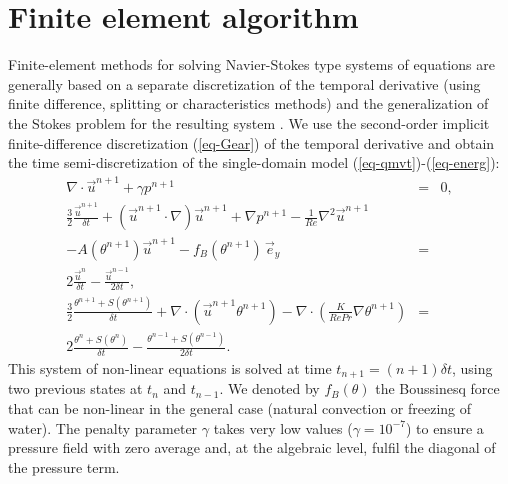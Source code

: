 \section{Finite element algorithm} \label{sec-FE-algo}

Finite-element methods for solving Navier-Stokes type systems of equations  are generally based on a separate discretization of the temporal derivative (using finite difference, splitting or characteristics methods) and the generalization of the Stokes problem for the resulting system \citep{Temam,GRaviart,Quarteroni}. We use the second-order implicit finite-difference discretization (\ref{eq-Gear}) of the temporal derivative and obtain the time semi-discretization of the single-domain model (\ref{eq-qmvt})-(\ref{eq-energ}):
\begin{eqnarray} \label{eq-time-disc1}
\nabla\cdot \vec{u}^{n+1} + {\gamma} p^{n+1} &=& 0, \\ \nonumber
\frac{3}{2} \frac{\vec{u}^{n+1}}{\delta t} +(\vec{u}^{n+1}\cdot\nabla) \vec{u}^{n+1} +\nabla p^{n+1} 
- {\frac{1}{Re} \nabla^2 \vec u^{n+1}}  & & \\ \nonumber 
- A(\theta^{n+1})\vec u^{n+1}- f_B(\theta^{n+1}) \, \vec{e}_y &=&  \\
2 \frac{\vec{u}^{n}}{\delta t}-\frac{\vec{u}^{n-1}}{2\delta t},\\ \nonumber
\frac{3}{2} \frac{\theta^{n+1} + S(\theta^{n+1})}{\delta t} +
\nabla\cdot\left(\vec{u}^{n+1} \theta^{n+1}\right)
- \nabla \cdot\left( \frac{K}{RePr} \nabla \theta^{n+1} \right) &=& \\ \label{eq-time-disc3}
2\frac{ \theta^{n} + S(\theta^{n})}{\delta t}-\frac{ \theta^{n-1} + S(\theta^{n-1}) }{2\delta t}.
\end{eqnarray}
This system of non-linear equations is solved at time  $t_{n+1}=(n+1) \delta t$, using two  previous states at $t_{n}$ and $t_{n-1}$.  We denoted by $f_B(\theta)$ the Boussinesq force that can be non-linear in the general case (\eg natural convection or freezing of water). The penalty parameter $\gamma$ 
takes very low values ($\gamma=10^{-7}$)  to ensure a pressure field with zero average and, at the algebraic level, fulfil the diagonal of the pressure term.  


